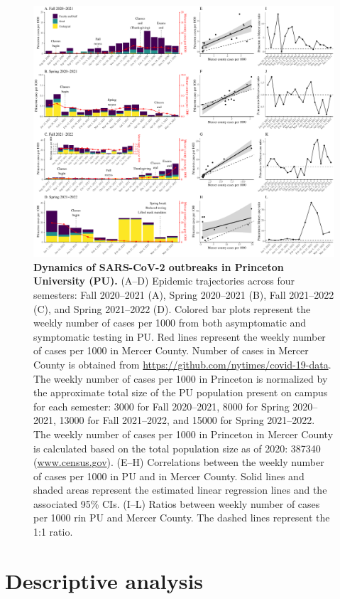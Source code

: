 \documentclass[12pt]{article}
\begin{document}
\begin{figure}[!th]
\includegraphics[width=\textwidth]{../figure_princeton_new/figure_princeton_new_per_1000.pdf}
\caption{
\textbf{Dynamics of SARS-CoV-2 outbreaks in Princeton University (PU).}
(A--D) Epidemic trajectories across four semesters: Fall 2020--2021 (A), Spring 2020--2021 (B), Fall 2021--2022 (C), and Spring 2021--2022 (D).
Colored bar plots represent the weekly number of cases per 1000 from both asymptomatic and symptomatic testing in PU.
Red lines represent the weekly number of cases per 1000 in Mercer County.
Number of cases in Mercer County is obtained from \url{https://github.com/nytimes/covid-19-data}.
The weekly number of cases per 1000 in Princeton is normalized by the approximate total size of the PU population present on campus for each semester: 3000 for Fall 2020--2021, 8000 for Spring 2020--2021, 13000 for Fall 2021--2022, and 15000 for Spring 2021--2022.
The weekly number of cases per 1000 in Princeton in Mercer County is calculated based on the total population size as of 2020: 387340 (\url{www.census.gov}).
(E--H) Correlations between the weekly number of cases per 1000 in PU and in Mercer County.
Solid lines and shaded areas represent the estimated linear regression lines and the associated 95\% CIs.
(I--L) Ratios between weekly number of cases per 1000 rin PU and Mercer County.
The dashed lines represent the 1:1 ratio.
\label{fig:princeton}
}
\end{figure}

\section*{Descriptive analysis}
\end{document}
